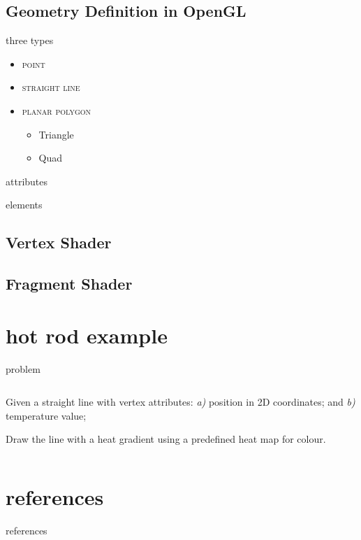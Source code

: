 \documentclass[aspectratio=169,xcolor={dvipsnames,svgnames}]{beamer}
\begin{document}
\subsection{Geometry Definition in OpenGL}
\label{sec:org53f28ee}
\begin{frame}[label={sec:orgb370a4e}]{three types}
\begin{itemize}[<+ | alert@+>]
\item \huge \textsc{point}
\item \huge \textsc{straight line}
\item \huge \textsc{planar polygon}
\normalsize
\begin{itemize}[<. | only@.>]
\item Triangle
\item Quad
\end{itemize}
\end{itemize}
\end{frame}
\begin{frame}[label={sec:org594f87c}]{attributes}
\end{frame}
\begin{frame}[label={sec:orgaa0f0b9}]{elements}
\end{frame}
\subsection{Vertex Shader}
\label{sec:org1ec3a31}
\subsection{Fragment Shader}
\label{sec:orgabb0cdd}
\section{hot rod example}
\label{sec:orgfaa46b5}
\begin{frame}[label={sec:org519b806}]{problem}
\begin{columns}
\begin{column}{.45\columnwidth}
\alert{Given} a straight line with vertex attributes: \emph{a)}
position in 2D coordinates; and \emph{b)} temperature value;

\alert{Draw} the line with a heat gradient using a predefined
heat map for colour.
\end{column}
\end{columns}
\end{frame}

\section*{references}
\label{sec:orge1e3251}
\begin{frame}[allowframebreaks]{references}
\printbibliography
\end{frame}
\end{document}
